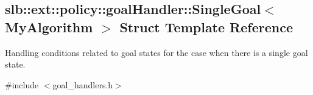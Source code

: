 \hypertarget{structslb_1_1ext_1_1policy_1_1goalHandler_1_1SingleGoal}{}\subsection{slb\+:\+:ext\+:\+:policy\+:\+:goal\+Handler\+:\+:Single\+Goal$<$ My\+Algorithm $>$ Struct Template Reference}
\label{structslb_1_1ext_1_1policy_1_1goalHandler_1_1SingleGoal}


Handling conditions related to goal states for the case when there is a single goal state.  




{\ttfamily \#include $<$goal\+\_\+handlers.\+h$>$}

